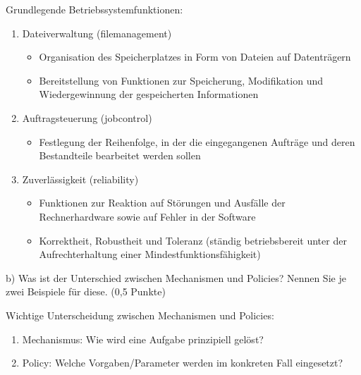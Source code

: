 \documentclass[a4paper,12pt]{article}
\begin{document}
\vspace{\baselineskip}
\vspace{\baselineskip}
\vspace{\baselineskip}
\large Grundlegende Betriebssystemfunktionen:
\normalsize
\begin{enumerate}
	\item Dateiverwaltung (filemanagement)
	\begin{itemize}
		\item Organisation des Speicherplatzes in Form von Dateien auf Datenträgern
		\item Bereitstellung von Funktionen zur Speicherung, Modifikation und Wiedergewinnung der gespeicherten Informationen
	\end{itemize}
	\item Auftragsteuerung (jobcontrol)
	\begin{itemize}
		\item Festlegung der Reihenfolge, in der die eingegangenen Aufträge und deren Bestandteile bearbeitet werden sollen
	\end{itemize}
	\item Zuverlässigkeit (reliability)
	\begin{itemize}
		\item Funktionen zur Reaktion auf Störungen und Ausfälle der Rechnerhardware sowie auf Fehler in der Software
		\item Korrektheit, Robustheit und Toleranz (ständig betriebsbereit unter der Aufrechterhaltung einer Mindestfunktionsfähigkeit)
	\end{itemize}
\end{enumerate}

\vspace{\baselineskip}
 b) Was ist der Unterschied zwischen Mechanismen und Policies? Nennen Sie je zwei Beispiele für diese.
(0,5 Punkte)

\vspace{\baselineskip}

 \large Wichtige Unterscheidung zwischen Mechanismen und Policies:
 \normalsize
	\begin{enumerate}
		\item Mechanismus: Wie wird eine Aufgabe prinzipiell gelöst?
		\item Policy: Welche Vorgaben/Parameter werden im konkreten Fall eingesetzt?
	\end{enumerate}

\vspace{\baselineskip}
\end{document}

